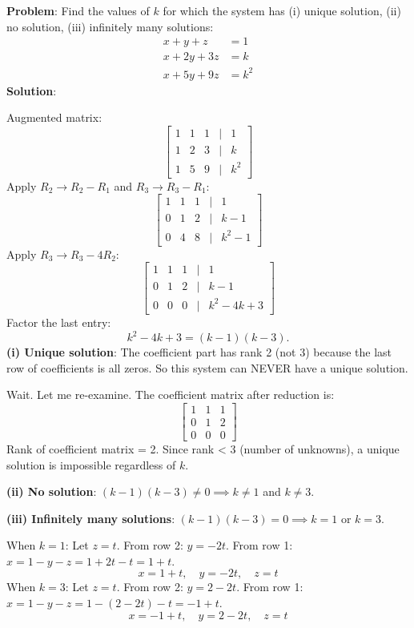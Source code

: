 \documentclass[
]{article}
\begin{document}
\textbf{Problem}: Find the values of \(k\) for which the system has (i)
unique solution, (ii) no solution, (iii) infinitely many solutions:
\[
\begin{aligned}
x + y + z &= 1 \\
x + 2y + 3z &= k \\
x + 5y + 9z &= k^2
\end{aligned}
\]
\textbf{Solution}:

Augmented matrix:
\[
\begin{bmatrix}
1 & 1 & 1 & | & 1 \\
1 & 2 & 3 & | & k \\
1 & 5 & 9 & | & k^2
\end{bmatrix}
\]
Apply \(R_2 \to R_2 - R_1\) and \(R_3 \to R_3 - R_1\):
\[
\begin{bmatrix}
1 & 1 & 1 & | & 1 \\
0 & 1 & 2 & | & k - 1 \\
0 & 4 & 8 & | & k^2 - 1
\end{bmatrix}
\]
Apply \(R_3 \to R_3 - 4R_2\):
\[
\begin{bmatrix}
1 & 1 & 1 & | & 1 \\
0 & 1 & 2 & | & k - 1 \\
0 & 0 & 0 & | & k^2 - 4k + 3
\end{bmatrix}
\]
Factor the last entry:
\[
k^2 - 4k + 3 = (k - 1)(k - 3).
\]
\textbf{(i) Unique solution}: The coefficient part has rank 2 (not 3)
because the last row of coefficients is all zeros. So this system can
NEVER have a unique solution.

Wait. Let me re-examine. The coefficient matrix after reduction is:
\[
\begin{bmatrix}
1 & 1 & 1 \\
0 & 1 & 2 \\
0 & 0 & 0
\end{bmatrix}
\]
Rank of coefficient matrix = 2. Since rank \textless{} 3 (number of
unknowns), a unique solution is impossible regardless of \(k\).

\textbf{(ii) No solution}: \((k - 1)(k - 3) \neq 0 \implies k \neq 1\)
and \(k \neq 3\).

\textbf{(iii) Infinitely many solutions}:
\((k - 1)(k - 3) = 0 \implies k = 1\) or \(k = 3\).

When \(k = 1\): Let \(z = t\). From row 2: \(y = -2t\). From row 1:
\(x = 1 - y - z = 1 + 2t - t = 1 + t\).
\[
x = 1 + t, \quad y = -2t, \quad z = t
\]
When \(k = 3\): Let \(z = t\). From row 2: \(y = 2 - 2t\). From row 1:
\(x = 1 - y - z = 1 - (2 - 2t) - t = -1 + t\).
\[
x = -1 + t, \quad y = 2 - 2t, \quad z = t
\]
\end{document}
